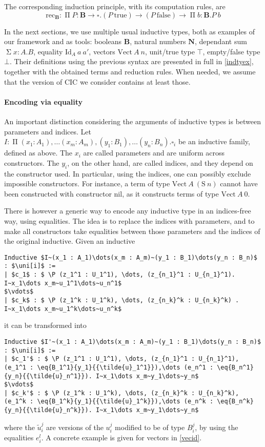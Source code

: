 \documentclass[en]{myarticle}
\renewcommand{\mathtt}{\mathrm}
\newcommand{\uni}[1][]{\square_{#1}}
\newcommand{\red}{\mapsto}
\newcommand{\ired}{\red_\iota}
\renewcommand{\P}{\operatorname{\Pi}}
\renewcommand{\S}{\operatorname{\Sigma}}
\newcommand{\unit}{\top}
\DeclareMathOperator{\?}{?}
\newcommand{\rec}{\mathtt{rec}}
\newcommand{\bool}{\mathbf{B}}
\newcommand{\nat}{\mathbf{N}}
\newcommand{\s}{\mathtt{S}}
\newcommand{\eq}[3]{\mathtt{Id}_{#1}~#2~#3}
\newcommand{\ve}{\mathtt{Vect}}
\newcommand{\nil}{\mathtt{nil}}
\newcommand{\true}{\mathtt{true}}
\newcommand{\false}{\mathtt{false}}
\begin{document}
{The corresponding induction principle, with its computation rules, are
	\[\rec_{\bool} : \P P : \bool \to \uni. (P~\true) \to (P~\false) \to \P b : \bool. P~b\]

In the next sections, we use multiple usual inductive types, both as examples of our framework and as tools: booleans $\bool$, natural numbers $\nat$, dependant sum $\S x : A. B$, equality $\eq{A}{a}{a'}$, vectors $\ve~A~n$, unit/true type $\unit$, empty/false type $\bot$. Their definitions using the previous syntax are presented in full in \autoref{indtyex}, together with the obtained terms and reduction rules. When needed, we assume that the version of CIC we consider contains at least those.

\paragraph{Encoding via equality}

An important distinction considering the arguments of inductive types is between parameters and indices. Let $I :  \P (x_1 : A_1),\dots (x_m : A_m),(y_1 : B_1),\dots (y_n : B_n) . \uni[i]$ be an inductive family, defined as above. The $x_i$ are called parameters and are uniform across constructors. The $y_i$, on the other hand, are called indices, and they depend on the constructor used. In particular, using the indices, one can possibly exclude impossible constructors. For instance, a term of type $\ve~A~(\s~n)$ cannot have been constructed with constructor $\nil$, as it constructs terms of type $\ve~A~0$.

There is however a generic way to encode any inductive type in an indices-free way, using equalities. The idea is to replace the indices with parameters, and to make all constructors take equalities between those parameters and the indices of the original inductive. Given an inductive
\begin{lstlisting}
Inductive $I~(x_1 : A_1)\dots(x_m : A_m)~(y_1 : B_1)\dots(y_n : B_n)$ : $\uni[i]$ :=
| $c_1$ : $ \P (z_1^1 : U_1^1), \dots, (z_{n_1}^1 : U_{n_1}^1). I~x_1\dots x_m~u_1^1\dots~u_n^1$
$\vdots$
| $c_k$ : $ \P (z_1^k : U_1^k), \dots, (z_{n_k}^k : U_{n_k}^k) . I~x_1\dots x_m~u_1^k\dots~u_n^k$
\end{lstlisting}
it can be transformed into
\begin{lstlisting}
Inductive $I'~(x_1 : A_1)\dots(x_m : A_m)~(y_1 : B_1)\dots(y_n : B_n)$ : $\uni[i]$ :=
| $c_1'$ : $ \P (z_1^1 : U_1^1), \dots, (z_{n_1}^1 : U_{n_1}^1), (e_1^1 : \eq{B_1^1}{y_1}{{\tilde{u}_1^1}}),\dots (e_n^1 : \eq{B_n^1}{y_n}{{\tilde{u}_n^1}}). I~x_1\dots x_m~y_1\dots~y_n$
$\vdots$
| $c_k'$ : $ \P (z_1^k : U_1^k), \dots, (z_{n_k}^k : U_{n_k}^k), (e_1^k : \eq{B_1^k}{y_1}{{\tilde{u}_1^k}}),\dots (e_n^k : \eq{B_n^k}{y_n}{{\tilde{u}_n^k}}). I~x_1\dots x_m~y_1\dots~y_n$
\end{lstlisting}
where the $\tilde{u}_i^j$ are versions of the $u_i^j$ modified to be of type $B_i^j$, by using the equalities $e_i^l$. A concrete example is given for vectors in \autoref{vecid}.

}
\end{document}
